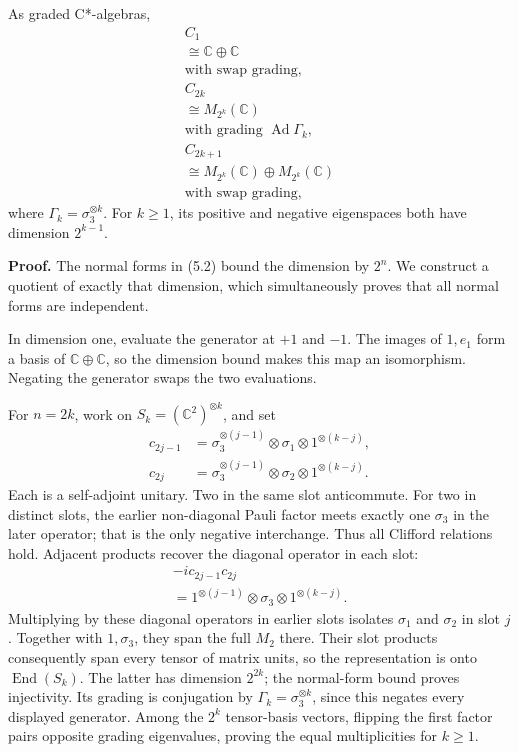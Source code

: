 \documentclass[
  11pt,
]{article}
\begin{document}
As graded C*-algebras, \[
\begin{gathered}
C_1\\\cong\mathbb C\oplus\mathbb C\\
\text{with swap grading},\\
C_{2k}\\\cong M_{2^k}(\mathbb C)\\
\text{with grading }\operatorname{Ad}\Gamma_k,\\
C_{2k+1}\\\cong M_{2^k}(\mathbb C)\oplus M_{2^k}(\mathbb C)\\
\text{with swap grading},
\end{gathered}
\tag{5.4}
\] where \(\Gamma_k=\sigma_3^{\otimes k}\). For \(k\geq1\), its positive
and negative eigenspaces both have dimension \(2^{k-1}\).

\textbf{Proof.} The normal forms in (5.2) bound the dimension by
\(2^n\). We construct a quotient of exactly that dimension, which
simultaneously proves that all normal forms are independent.

In dimension one, evaluate the generator at \(+1\) and \(-1\). The
images of \(1,e_1\) form a basis of \(\mathbb C\oplus\mathbb C\), so the
dimension bound makes this map an isomorphism. Negating the generator
swaps the two evaluations.

For \(n=2k\), work on \(S_k=(\mathbb C^2)^{\otimes k}\), and set \[
\begin{aligned}
c_{2j-1}&=\sigma_3^{\otimes(j-1)}\otimes\sigma_1\otimes1^{\otimes(k-j)},\\
c_{2j}&=\sigma_3^{\otimes(j-1)}\otimes\sigma_2\otimes1^{\otimes(k-j)}.
\end{aligned}
\tag{5.5}
\] Each is a self-adjoint unitary. Two in the same slot anticommute. For
two in distinct slots, the earlier non-diagonal Pauli factor meets
exactly one \(\sigma_3\) in the later operator; that is the only
negative interchange. Thus all Clifford relations hold. Adjacent
products recover the diagonal operator in each slot: \[
\begin{gathered}
-ic_{2j-1}c_{2j}\\=1^{\otimes(j-1)}\otimes\sigma_3\otimes1^{\otimes(k-j)}.
\end{gathered}
\tag{5.6}
\] Multiplying by these diagonal operators in earlier slots isolates
\(\sigma_1\) and \(\sigma_2\) in slot \(j\). Together with
\(1,\sigma_3\), they span the full \(M_2\) there. Their slot products
consequently span every tensor of matrix units, so the representation is
onto \(\operatorname{End}(S_k)\). The latter has dimension \(2^{2k}\);
the normal-form bound proves injectivity. Its grading is conjugation by
\(\Gamma_k=\sigma_3^{\otimes k}\), since this negates every displayed
generator. Among the \(2^k\) tensor-basis vectors, flipping the first
factor pairs opposite grading eigenvalues, proving the equal
multiplicities for \(k\geq1\).
\end{document}
